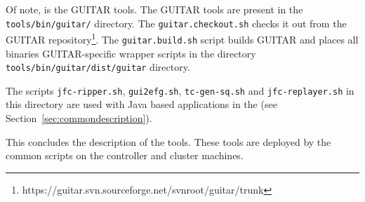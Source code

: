 Of note, is the GUITAR tools. The GUITAR tools are present in the \texttt{tools/bin/guitar/} directory. The \texttt{guitar.checkout.sh} checks it out from the GUITAR repository\footnote{https://guitar.svn.sourceforge.net/svnroot/guitar/trunk}. The \texttt{guitar.build.sh} script builds GUITAR and places all binaries GUITAR-specific wrapper scripts in the directory \texttt{tools/bin/guitar/dist/guitar} directory.

The scripts \texttt{jfc-ripper.sh}, \texttt{gui2efg.sh}, \texttt{tc-gen-sq.sh} and \texttt{jfc-replayer.sh} in this directory are used with Java based applications in the \mddozen{} (see Section~\ref{sec:commondescription}).

\vspace{12pt}
This concludes the description of the tools. These tools are deployed by the common scripts on the controller and cluster machines.

